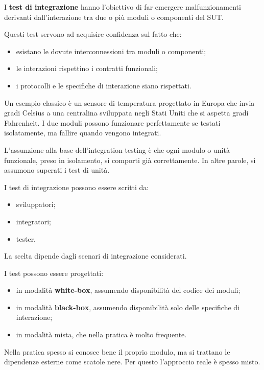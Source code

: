 I \textbf{test di integrazione} hanno l'obiettivo di far emergere malfunzionamenti derivanti dall'interazione tra due o più moduli o componenti del SUT.

Questi test servono ad acquisire confidenza sul fatto che:

\begin{itemize}
    \item esistano le dovute interconnessioni tra moduli o componenti;
    \item le interazioni rispettino i contratti funzionali;
    \item i protocolli e le specifiche di interazione siano rispettati.
\end{itemize}

\begin{notaprof}
Un esempio classico è un sensore di temperatura progettato in Europa che invia gradi Celsius a una centralina sviluppata negli Stati Uniti che si aspetta gradi Fahrenheit. I due moduli possono funzionare perfettamente se testati isolatamente, ma fallire quando vengono integrati.
\end{notaprof}

L'assunzione alla base dell'integration testing è che ogni modulo o unità funzionale, preso in isolamento, si comporti già correttamente. In altre parole, si assumono superati i test di unità.

I test di integrazione possono essere scritti da:

\begin{itemize}
    \item sviluppatori;
    \item integratori;
    \item tester.
\end{itemize}

La scelta dipende dagli scenari di integrazione considerati.

I test possono essere progettati:

\begin{itemize}
    \item in modalità \textbf{white-box}, assumendo disponibilità del codice dei moduli;
    \item in modalità \textbf{black-box}, assumendo disponibilità solo delle specifiche di interazione;
    \item in modalità mista, che nella pratica è molto frequente.
\end{itemize}

\begin{notaprof}
Nella pratica spesso si conosce bene il proprio modulo, ma si trattano le dipendenze esterne come scatole nere. Per questo l'approccio reale è spesso misto.
\end{notaprof}

